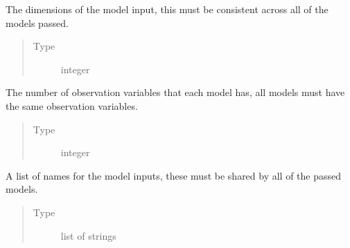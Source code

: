 \documentclass[letterpaper,10pt,english,openany,oneside]{sphinxmanual}
\begin{document}
\begin{fulllineitems}

\begin{fulllineitems}
\label{\detokenize{nloed:nloed.design.Design.input_dim}}
The dimensions of the model input, this must be consistent across all
of the models passed.
\begin{quote}\begin{description}
\item[{Type}] \leavevmode
integer

\end{description}\end{quote}

\end{fulllineitems}


\begin{fulllineitems}
\label{\detokenize{nloed:nloed.design.Design.observ_dim}}
The number of observation variables that each model has, all models
must have the same observation variables.
\begin{quote}\begin{description}
\item[{Type}] \leavevmode
integer

\end{description}\end{quote}

\end{fulllineitems}


\begin{fulllineitems}
\label{\detokenize{nloed:nloed.design.Design.input_name_list}}
A list of names for the model inputs, these must be shared
by all of the passed models.
\begin{quote}\begin{description}
\item[{Type}] \leavevmode
list of strings

\end{description}\end{quote}


\end{fulllineitems}
\end{fulllineitems}
\end{document}
